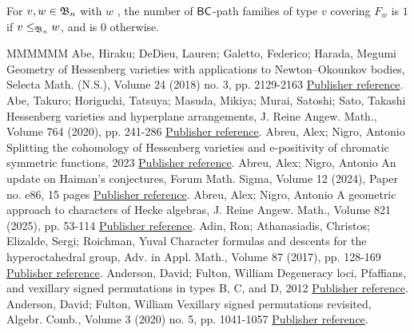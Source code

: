 \documentclass[11pt]{article}
\theoremstyle{definition}
\numberwithin{equation}{section}
\begin{document}
\begin{cor}\label{c:zigzagbc}
  For $v, w \in \mathfrak{B}_n$ with $w$ \avoidingp,
  the number of $\mathsf{BC}$-path families of type $v$ covering $F_w$ is
  $1$ if $v \leq_{\mathfrak{B}_n} w$, and is $0$ otherwise.
\end{cor}
\begin{thebibliography}{MMMMMM}
 Abe, Hiraku; DeDieu, Lauren; Galetto, Federico; Harada, Megumi Geometry of Hessenberg varieties with applications to Newton–Okounkov bodies, Selecta Math. (N.S.), Volume 24 (2018) no. 3, pp. 2129-2163 \href{https://alco.centre-mersenne.org/articles/10.5802/alco.459/#ADGHGeoHess}{Publisher reference}.
 Abe, Takuro; Horiguchi, Tatsuya; Masuda, Mikiya; Murai, Satoshi; Sato, Takashi Hessenberg varieties and hyperplane arrangements, J. Reine Angew. Math., Volume 764 (2020), pp. 241-286 \href{https://alco.centre-mersenne.org/articles/10.5802/alco.459/#AHMMSHess}{Publisher reference}.
 Abreu, Alex; Nigro, Antonio Splitting the cohomology of Hessenberg varieties and e-positivity of chromatic symmetric functions, 2023 \href{https://alco.centre-mersenne.org/articles/10.5802/alco.459/#ANigroSplit}{Publisher reference}.
 Abreu, Alex; Nigro, Antonio An update on Haiman’s conjectures, Forum Math. Sigma, Volume 12 (2024), Paper no. e86, 15 pages \href{https://alco.centre-mersenne.org/articles/10.5802/alco.459/#ANigroUpdate}{Publisher reference}.
 Abreu, Alex; Nigro, Antonio A geometric approach to characters of Hecke algebras, J. Reine Angew. Math., Volume 821 (2025), pp. 53-114 \href{https://alco.centre-mersenne.org/articles/10.5802/alco.459/#ANigroGeoAppro}{Publisher reference}.
 Adin, Ron; Athanasiadis, Christos; Elizalde, Sergi; Roichman, Yuval Character formulas and descents for the hyperoctahedral group, Adv. in Appl. Math., Volume 87 (2017), pp. 128-169 \href{https://alco.centre-mersenne.org/articles/10.5802/alco.459/#AAERCharFormulasHyper}{Publisher reference}.
 Anderson, David; Fulton, William Degeneracy loci, Pfaffians, and vexillary signed permutations in types B, C, and D, 2012 \href{https://alco.centre-mersenne.org/articles/10.5802/alco.459/#AFultonDLoci}{Publisher reference}.
 Anderson, David; Fulton, William Vexillary signed permutations revisited, Algebr. Comb., Volume 3 (2020) no. 5, pp. 1041-1057 \href{https://alco.centre-mersenne.org/articles/10.5802/alco.459/#AFultonVexRevisited}{Publisher reference}.

\end{thebibliography}
\end{document}
